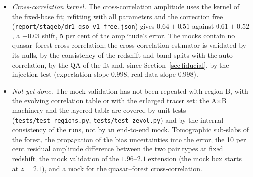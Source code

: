 \documentclass[11pt,a4paper]{article}
\begin{document}
\begin{itemize}
\item \emph{Cross-correlation kernel.} The cross-correlation amplitude uses the kernel of the fixed-base fit; refitting with all parameters and the correction free (\texttt{report/stageb/dr1\_qso\_v1\_free.json}) gives $0.64\pm0.51$ against $0.61\pm0.52$, a $+0.03$ shift, 5 per cent of the amplitude's error. The mocks contain no quasar--forest cross-correlation; the cross-correlation estimator is validated by its nulls, by the consistency of the redshift and band splits with the auto-correlation, by the QA of the fit and, since Section~\ref{sec:fiducial}, by the injection test (expectation slope $0.998$, real-data slope $0.998$).
\item \emph{Not yet done.} The mock validation has not been repeated with region B, with the evolving correlation table or with the enlarged tracer set: the A$\times$B machinery and the layered table are covered by unit tests (\texttt{tests/test\_regions.py}, \texttt{tests/test\_zevol.py}) and by the internal consistency of the runs, not by an end-to-end mock. Tomographic sub-slabs of the forest, the propagation of the bias uncertainties into the error, the 10 per cent residual amplitude difference between the two pair types at fixed redshift, the mock validation of the $1.96$--$2.1$ extension (the mock box starts at $z=2.1$), and a mock for the quasar--forest cross-correlation.
\end{itemize}
\end{document}
